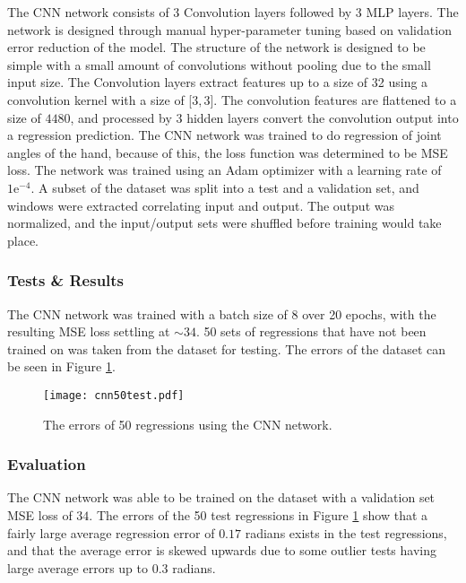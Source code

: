 \documentclass[../main.tex]{subfiles}
\begin{document}
The \gls{CNN} network consists of 3 Convolution layers followed by 3 \gls{MLP} layers.
The network is designed through manual hyper-parameter tuning based on validation error reduction of the model.
The structure of the network is designed to be simple with a small amount of convolutions without pooling due to the small input size.
The Convolution layers extract features up to a size of 32 using a convolution kernel with a size of [$3, 3$].
The convolution features are flattened to a size of $4480$, and processed by 3 hidden layers convert the convolution output into a regression prediction.
The \gls{CNN} network was trained to do regression of joint angles of the hand, because of this, the loss function was determined to be \gls{MSE} loss.
The network was trained using an Adam optimizer with a learning rate of $1\text{e}^{-4}$.
A subset of the dataset was split into a test and a validation set, and windows were extracted correlating input and output.
The output was normalized, and the input/output sets were shuffled before training would take place.


\subsubsection{Tests \& Results}


The \gls{CNN} network was trained with a batch size of 8 over 20 epochs, with the resulting \gls{MSE} loss settling at $\sim 34$.
50 sets of regressions that have not been trained on was taken from the dataset for testing.
The errors of the dataset can be seen in Figure \ref{fig:cnntest}.

\begin{figure}[H]
\begin{center}
\texttt{[image: cnn50test.pdf]}
\caption{The errors of 50 regressions using the CNN network.}
\label{fig:cnntest}
\end{center}
\end{figure}

\subsubsection{Evaluation}

The \gls{CNN} network was able to be trained on the dataset with a validation set \gls{MSE} loss of $34$.
The errors of the 50 test regressions in Figure \ref{fig:cnntest} show that a fairly large average regression error of $0.17$ radians exists in the test regressions, and that the average error is skewed upwards due to some outlier tests having large average errors up to $0.3$ radians.
\end{document}
